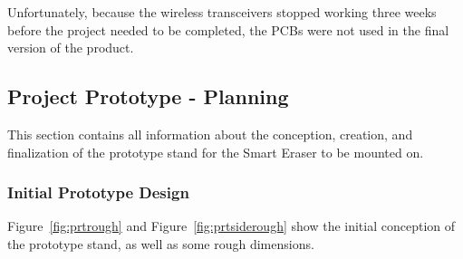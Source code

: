 Unfortunately, because the wireless transceivers stopped working three weeks before the project needed to be completed, the PCBs were not used in the final version of the product.

\subsection{Project Prototype - Planning}

This section contains all information about the conception, creation, and finalization of the prototype stand for the Smart Eraser to be mounted on.\\

\subsubsection{Initial Prototype Design}

Figure~\ref{fig:prtrough} and Figure~\ref{fig:prtsiderough} show the initial conception of the prototype stand, as well as some rough dimensions.

